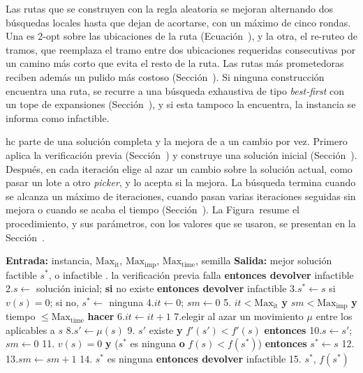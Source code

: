 Las rutas que se construyen con la regla aleatoria se mejoran alternando dos
búsquedas locales hasta que dejan de acortarse, con un máximo de cinco
rondas. Una es 2-opt sobre las ubicaciones de la ruta
(Ecuación~\in[eq:2opt]), y la otra, el re-ruteo de tramos, que reemplaza el
tramo entre dos ubicaciones requeridas consecutivas por un camino más corto
que evita el resto de la ruta. Las rutas más prometedoras reciben además un
pulido más costoso (Sección~). Si ninguna
construcción encuentra una ruta, se recurre a una búsqueda exhaustiva de tipo
{\em best-first} con un tope de expansiones
(Sección~), y si esta tampoco la encuentra, la
instancia se informa como infactible.

\stopsubsection

\stopsection

\startsection[title={Hill Climbing}, reference=sec:hc]

\ac{hc} parte de una solución completa y la mejora de a un cambio por vez.
Primero aplica la verificación previa (Sección~) y
construye una solución inicial (Sección~).
Después, en cada iteración elige al azar un cambio sobre la solución actual,
como pasar un lote a otro {\em picker}, y lo acepta si la mejora. La búsqueda
termina cuando se alcanza un máximo de iteraciones, cuando pasan varias
iteraciones seguidas sin mejora o cuando se acaba el tiempo
(Sección~). La Figura~ resume el
procedimiento, y sus parámetros, con los valores que se usaron, se presentan
en la Sección~.

\startplacefigure[title={Pseudocódigo de \ac{hc}.}, reference=fig:hc_pseudocodigo]
\startframedtext[width=broad, frame=on, align=flushleft]
\startlines
{\bf Entrada:} instancia, $\text{Max}_{\text{it}}$, $\text{Max}_{\text{imp}}$, $\text{Max}_{\text{time}}$, semilla
{\bf Salida:} mejor solución factible $s^*$, o infactible
. la verificación previa falla {\bf entonces devolver} infactible
2.\quad $s \leftarrow$ solución inicial; {\bf si} no existe {\bf entonces devolver} infactible
3.\quad $s^* \leftarrow s$ si $v(s) = 0$; si no, $s^* \leftarrow$ ninguna
4.\quad $it \leftarrow 0$;\; $sm \leftarrow 0$
5. $it < \text{Max}_{\text{it}}$ {\bf y} $sm < \text{Max}_{\text{imp}}$ {\bf y} tiempo $\leq \text{Max}_{\text{time}}$ {\bf hacer}
6.\quad\qquad $it \leftarrow it + 1$
7.\quad\qquad elegir al azar un movimiento $\mu$ entre los aplicables a $s$
8.\quad\qquad $s' \leftarrow \mu(s)$
9.\quad{} $s'$ existe {\bf y} $f'(s') < f'(s)$ {\bf entonces}
10.\quad\qquad\qquad $s \leftarrow s'$;\; $sm \leftarrow 0$
11.\quad\qquad{} $v(s) = 0$ {\bf y} ($s^*$ es ninguna {\bf o} $f(s) < f(s^*)$) {\bf entonces} $s^* \leftarrow s$
12.\quad{}
13.\quad\qquad\qquad $sm \leftarrow sm + 1$
14. $s^*$ es ninguna {\bf entonces devolver} infactible
15. $s^*$, $f(s^*)$
\stoplines
\stopframedtext
\stopplacefigure

